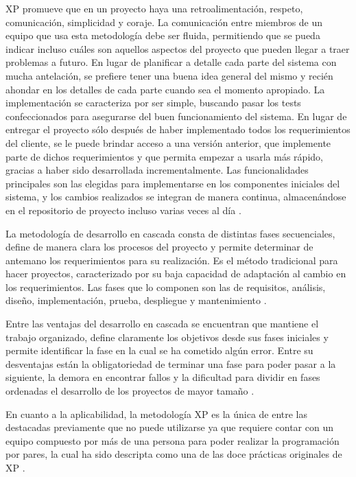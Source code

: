 \documentclass[twoside]{article}
\begin{document}
XP promueve que en un proyecto haya una retroalimentación, respeto, comunicación, simplicidad y coraje. La comunicación entre miembros de un equipo que usa esta metodología debe ser fluida, permitiendo que se pueda indicar incluso cuáles son aquellos aspectos del proyecto que pueden llegar a traer problemas a futuro. En lugar de planificar a detalle cada parte del sistema con mucha antelación, se prefiere tener una buena idea general del mismo y recién ahondar en los detalles de cada parte cuando sea el momento apropiado. La implementación se caracteriza por ser simple, buscando pasar los tests confeccionados para asegurarse del buen funcionamiento del sistema. En lugar de entregar el proyecto sólo después de haber implementado todos los requerimientos del cliente, se le puede brindar acceso a una versión anterior, que implemente parte de dichos requerimientos y que permita empezar a usarla más rápido, gracias a haber sido desarrollada incrementalmente. Las funcionalidades principales son las elegidas para implementarse en los componentes iniciales del sistema, y los cambios realizados se integran de manera continua, almacenándose en el repositorio de proyecto incluso varias veces al día \parencite{agileProjectManagement}.

La metodología de desarrollo en cascada consta de distintas fases secuenciales, define de manera clara los procesos del proyecto y permite determinar de antemano los requerimientos para su realización. Es el método tradicional para hacer proyectos, caracterizado por su baja capacidad de adaptación al cambio en los requerimientos. Las fases que lo componen son las de requisitos, análisis, diseño, implementación, prueba, despliegue y mantenimiento \parencite{iepWaterfall}.

Entre las ventajas del desarrollo en cascada se encuentran que mantiene el trabajo organizado, define claramente los objetivos desde sus fases iniciales y permite identificar la fase en la cual se ha cometido algún error. Entre su desventajas están la obligatoriedad de terminar una fase para poder pasar a la siguiente, la demora en encontrar fallos y la dificultad para dividir en fases ordenadas el desarrollo de los proyectos de mayor tamaño \parencite{crehanaWaterfall}.

En cuanto a la aplicabilidad, la metodología XP es la única de entre las destacadas previamente que no puede utilizarse ya que requiere contar con un equipo compuesto por más de una persona para poder realizar la programación por pares, la cual ha sido descripta como una de las doce prácticas originales de XP \parencite{agileAlliance}.
\end{document}
